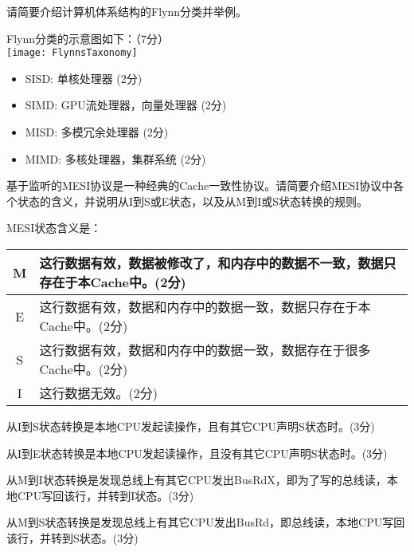 \documentclass[a4paper, 12pt, answers]{exam}
\begin{document}
\begin{questions}

\question[15]
请简要介绍计算机体系结构的Flynn分类并举例。

\begin{solution}[12cm]
	Flynn分类的示意图如下：（7分） \\
	\texttt{[image: FlynnsTaxonomy]}

	\begin{itemize}
		\item{SISD: 单核处理器 (2分)}
		\item{SIMD: GPU流处理器，向量处理器 (2分)}
		\item{MISD: 多模冗余处理器 (2分)}
		\item{MIMD: 多核处理器，集群系统 (2分)}
	\end{itemize}

\end{solution}


\question[20]
基于监听的MESI协议是一种经典的Cache一致性协议。请简要介绍MESI协议中各个状态的含义，并说明从I到S或E状态，以及从M到I或S状态转换的规则。 \\


\begin{solution}[12cm]
	MESI状态含义是： \\
	\begin{tabular}{| c | p{13cm} |}
		\hline
		M & 这行数据有效，数据被修改了，和内存中的数据不一致，数据只存在于本Cache中。(2分) \\ \hline
		E & 这行数据有效，数据和内存中的数据一致，数据只存在于本Cache中。(2分) \\ \hline
		S & 这行数据有效，数据和内存中的数据一致，数据存在于很多Cache中。(2分) \\ \hline
		I & 这行数据无效。(2分) \\ \hline
	\end{tabular}

	从I到S状态转换是本地CPU发起读操作，且有其它CPU声明S状态时。(3分)

	从I到E状态转换是本地CPU发起读操作，且没有其它CPU声明S状态时。(3分)

	从M到I状态转换是发现总线上有其它CPU发出BusRdX，即为了写的总线读，本地CPU写回该行，并转到I状态。(3分)

	从M到S状态转换是发现总线上有其它CPU发出BusRd，即总线读，本地CPU写回该行，并转到S状态。(3分)


\end{solution}
\end{questions}
\end{document}
